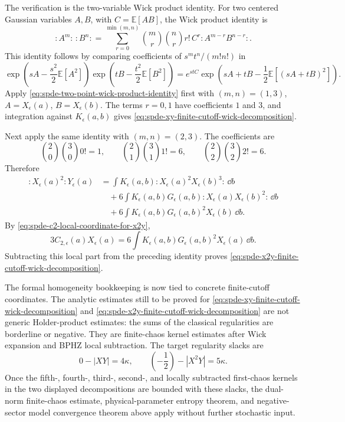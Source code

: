 The verification is the two-variable Wick product identity.
For two centered Gaussian variables \(A,B\), with
\(C=\mathbb E[AB]\), the Wick product identity is
\begin{equation}
  :\!A^m\!:\,:\!B^n\!:
  =
  \sum_{r=0}^{\min(m,n)}
  \binom{m}{r}\binom{n}{r}r!\,C^r
  :\!A^{m-r}B^{n-r}\!: .
  \label{eq:spde-two-point-wick-product-identity}
\end{equation}
This identity follows by comparing coefficients of \(s^mt^n/(m!n!)\) in
\[
  \exp\!\left(sA-\frac{s^2}{2}\mathbb E[A^2]\right)
  \exp\!\left(tB-\frac{t^2}{2}\mathbb E[B^2]\right)
  =
  e^{stC}
  \exp\!\left(sA+tB-\frac12\mathbb E[(sA+tB)^2]\right).
\]
Apply \eqref{eq:spde-two-point-wick-product-identity} first with
\((m,n)=(1,3)\), \(A=X_\epsilon(a)\), \(B=X_\epsilon(b)\).  The terms
\(r=0,1\) have coefficients \(1\) and \(3\), and integration against
\(K_\epsilon(a,b)\) gives
\eqref{eq:spde-xy-finite-cutoff-wick-decomposition}.

Next apply the same identity with \((m,n)=(2,3)\).  The coefficients are
\[
  \binom{2}{0}\binom{3}{0}0!=1,\qquad
  \binom{2}{1}\binom{3}{1}1!=6,\qquad
  \binom{2}{2}\binom{3}{2}2!=6 .
\]
Therefore
\[
\begin{aligned}
  :\!X_\epsilon(a)^2\!:Y_\epsilon(a)
  &=
  \int K_\epsilon(a,b)
  :X_\epsilon(a)^2X_\epsilon(b)^3:\,\dd b                         \\
  &\quad
  +6\int K_\epsilon(a,b)G_\epsilon(a,b)
  :X_\epsilon(a)X_\epsilon(b)^2:\,\dd b                            \\
  &\quad
  +6\int K_\epsilon(a,b)G_\epsilon(a,b)^2
  X_\epsilon(b)\,\dd b .
\end{aligned}
\]
By \eqref{eq:spde-c2-local-coordinate-for-x2y},
\[
  3C_{2,\epsilon}(a)X_\epsilon(a)
  =
  6\int K_\epsilon(a,b)G_\epsilon(a,b)^2
  X_\epsilon(a)\,\dd b .
\]
Subtracting this local part from the preceding identity proves
\eqref{eq:spde-x2y-finite-cutoff-wick-decomposition}.

The formal homogeneity bookkeeping is now tied to concrete finite-cutoff
coordinates.  The analytic estimates still to be proved for
\eqref{eq:spde-xy-finite-cutoff-wick-decomposition} and
\eqref{eq:spde-x2y-finite-cutoff-wick-decomposition} are not generic
Holder-product estimates: the sums of the classical regularities are
borderline or negative.  They are finite-chaos kernel estimates after
Wick expansion and BPHZ local subtraction.  The target regularity slacks are
\[
  0-|XY|=4\kappa,\qquad
  \left(-\frac12\right)-|X^2Y|=5\kappa .
\]
Once the fifth-, fourth-, third-, second-, and locally subtracted first-chaos
kernels in the two displayed decompositions are bounded with these slacks,
the dual-norm finite-chaos estimate, physical-parameter entropy theorem, and
negative-sector model convergence theorem above apply without further
stochastic input.

